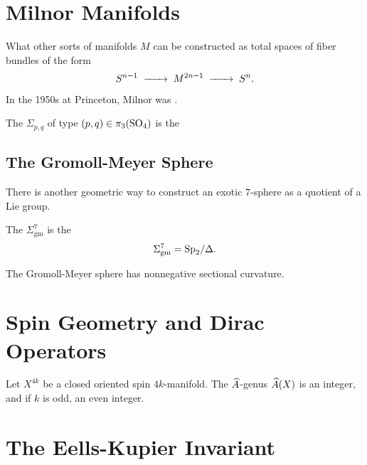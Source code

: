 
\section{Milnor Manifolds}

What other sorts of manifolds $M$ can be constructed as total spaces of fiber bundles of the form
\[
    S^{n-1} \lkxto M^{2n-1} \lkxto S^n.
\]

\begin{historicalremark*}
  In the 1950s at Princeton, Milnor was \cite{milnor2000exotic}. 
\end{historicalremark*}


\begin{definition}
	The  $\Sigma_{p,q}$ of type $(p,q)\in \pi_3({\operatorname{SO}}_4)$ is the
\end{definition}

\subsection{The Gromoll-Meyer Sphere}

There is another geometric way to construct an exotic $7$-sphere as a quotient of a Lie group.

\begin{definition}
	The  $\Sigma_{\mathrm{gm}}^7$ is the 
	\[
      \Sigma_{\mathrm{gm}}^7 = {\operatorname{Sp}}_2/\Delta.
	\]
\end{definition}

\begin{theorem}
  The Gromoll-Meyer sphere has nonnegative sectional curvature.
\end{theorem}

\section{Spin Geometry and Dirac Operators}

\begin{theorem}
  Let $X^{4k}$ be a closed oriented spin $4k$-manifold. The $\widehat{A}$-genus $\widehat{A}(X)$ is an integer, and if $k$ is odd, an even integer.
\end{theorem}

\section{The Eells-Kupier Invariant}

